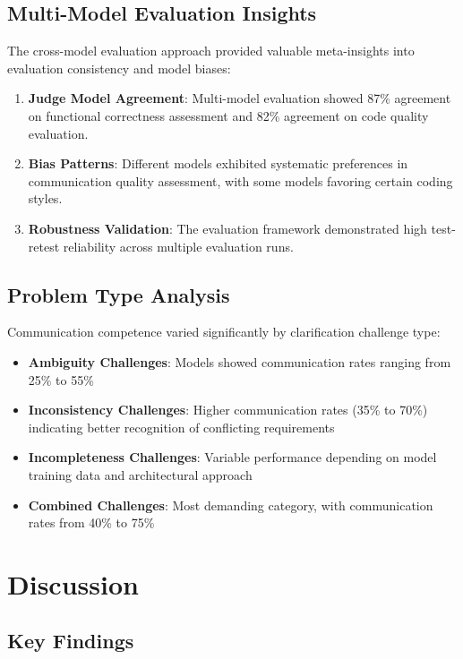 \documentclass[conference]{IEEEtran}
\begin{document}
\subsection{Multi-Model Evaluation Insights}

The cross-model evaluation approach provided valuable meta-insights into evaluation consistency and model biases:

\begin{enumerate}
    \item \textbf{Judge Model Agreement}: Multi-model evaluation showed 87\% agreement on functional correctness assessment and 82\% agreement on code quality evaluation.
    \item \textbf{Bias Patterns}: Different models exhibited systematic preferences in communication quality assessment, with some models favoring certain coding styles.
    \item \textbf{Robustness Validation}: The evaluation framework demonstrated high test-retest reliability across multiple evaluation runs.
\end{enumerate}

\subsection{Problem Type Analysis}

Communication competence varied significantly by clarification challenge type:

\begin{itemize}
    \item \textbf{Ambiguity Challenges}: Models showed communication rates ranging from 25\% to 55\%
    \item \textbf{Inconsistency Challenges}: Higher communication rates (35\% to 70\%) indicating better recognition of conflicting requirements
    \item \textbf{Incompleteness Challenges}: Variable performance depending on model training data and architectural approach
    \item \textbf{Combined Challenges}: Most demanding category, with communication rates from 40\% to 75\%
\end{itemize}

\section{Discussion}

\subsection{Key Findings}
\end{document}
